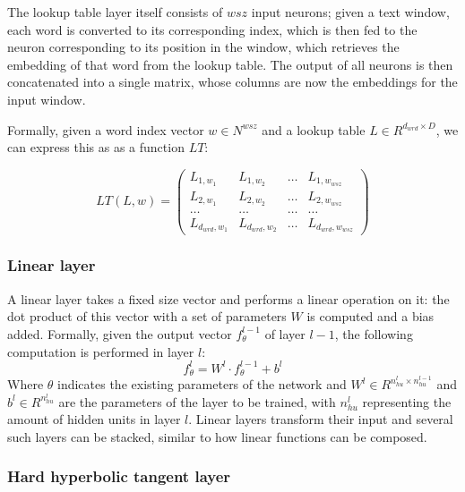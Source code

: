 The lookup table layer itself consists of $wsz$ input neurons; given a
text window, each word is converted to its corresponding index, which
is then fed to the neuron corresponding to its position in the window,
which retrieves the embedding of that word from the lookup table. The
output of all neurons is then concatenated into a single matrix, whose
columns are now the embeddings for the input window. 

Formally, given a word index vector $w \in N^{wsz}$ and a lookup table
$L \in R^{d_{wrd} \times D}$, we can express this as as a function
$LT$:

\begin{equation} \label{eq:ltmatrix}
  LT(L, w) = \left( \begin{array}{cccc}
      L_{1,w_1} & L_{1,w_2} & \ldots & L_{1,w_{wsz}} \\
      L_{2,w_1} & L_{2,w_2} & \ldots & L_{2,w_{wsz}} \\
      \ldots   & \ldots  & \ldots & \ldots \\
      L_{d_{wrd},w_1} & L_{d_{wrd},w_2} & \ldots & L_{d_{wrd},w_{wsz}} \end{array} \right)
\end{equation}
\subsubsection{Linear layer}

A linear layer takes a fixed size vector and performs a linear
operation on it: the dot product of this vector with a set of
parameters $W$ is computed and a bias added. Formally, given the
output vector $f^{l-1}_\theta$ of layer $l-1$, the following
computation is performed in layer $l$:
\begin{equation}
  f^l_\theta = W^l \cdot f^{l-1}_\theta + b^l
\end{equation}
Where $\theta$ indicates the existing parameters of the network and
$W^l \in R^{n^l_{hu} \times n^{l-1}_{hu}} $ and $b^l \in R^{n^l_{hu}} $
are the parameters of the layer to be trained, with $n^l_{hu}$
representing the amount of hidden units in layer $l$. Linear layers
transform their input and several such layers can be stacked, similar
to how linear functions can be composed.

\subsubsection{Hard hyperbolic tangent layer}

